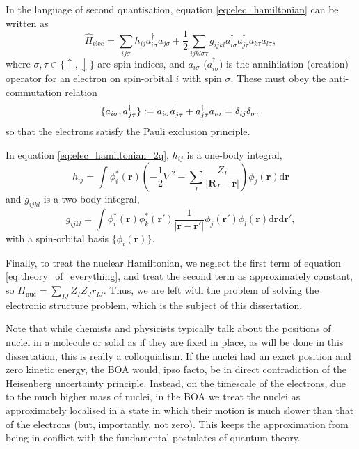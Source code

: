 In the language of second quantisation, equation \ref{eq:elec_hamiltonian} can be written as
\begin{equation}
\label{eq:elec_hamiltonian_2q}
\hat H_\mathrm{elec} = \sum_{ij\sigma} h_{ij}a_{i\sigma}^\dag a_{j\sigma}+\frac 12 \sum_{ijkl\sigma\tau} g_{ijkl}a_{i\sigma}^\dag a_{j\tau}^\dag a_{k\tau}a_{l\sigma},
\end{equation}
where $\sigma,\tau\in\{\uparrow,\downarrow\}$ are spin indices, and $a_{i\sigma}$ ($a_{i\sigma}^\dag$) is the annihilation (creation) operator for an electron on spin-orbital $i$ with spin $\sigma$. These must obey the anti-commutation relation
\begin{equation}
    \{a_{i\sigma},a_{j\tau}^\dag\}
    \mathrel{\mathop:}=
    a_{i\sigma}a_{j\tau}^\dag + a_{j\tau}^\dag a_{i\sigma}
    =\delta_{ij}\delta_{\sigma\tau}
\end{equation}
so that the electrons satisfy the Pauli exclusion principle.

In equation \ref{eq:elec_hamiltonian_2q}, $h_{ij}$ is a one-body integral,
\begin{equation}
\label{eq:hij}
h_{ij} = \int \phi_i^*(\mathbf{r})\left(-\frac 12 \nabla^2 - \sum_I \frac{Z_I}{|\mathbf{R}_I-\mathbf r|}\right)\phi_j(\mathbf{r})\mathrm{d}\mathbf{r}
\end{equation}
and $g_{ijkl}$ is a two-body integral,
\begin{equation}
g_{ijkl} = \int \phi_i^*(\mathbf{r})\phi_k^*(\mathbf{r}')\frac{1}{|\mathbf{r}-\mathbf{r}'|}\phi_j(\mathbf{r}')\phi_l(\mathbf{r})\mathrm{d}\mathbf{r}\mathrm{d}\mathbf{r}',
\end{equation}
with a spin-orbital basis $\{\phi_i(\mathbf{r})\}$.

Finally, to treat the nuclear Hamiltonian, we neglect the first term of equation \eqref{eq:theory_of_everything}, and treat the second term as approximately constant, so $\hat H_\mathrm{nuc} = \sum_{IJ} Z_IZ_Jr_{IJ}$. Thus, we are left with the problem of solving the electronic structure problem, which is the subject of this dissertation.

Note that while chemists and physicists typically talk about the positions of nuclei in a molecule or solid as if they are fixed in place, as will be done in this dissertation, this is really a colloquialism. If the nuclei had an exact position and zero kinetic energy, the \gls{BOA} would, ipso facto, be in direct contradiction of the Heisenberg uncertainty principle. Instead, on the timescale of the electrons, due to the much higher mass of nuclei, in the \gls{BOA} we treat the nuclei as approximately localised in a state in which their motion is much slower than that of the electrons (but, importantly, not zero). This keeps the approximation from being in conflict with the fundamental postulates of quantum theory.


